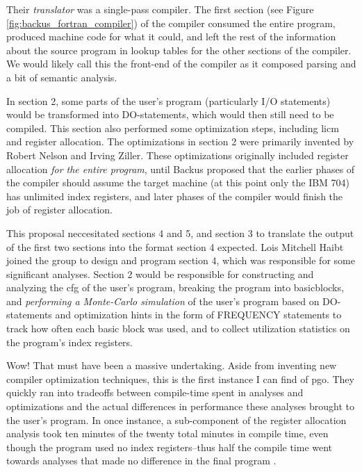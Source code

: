 Their \textit{translator} was a single-pass compiler.
The first section (see Figure \ref{fig:backus_fortran_compiler}) of the compiler
consumed the entire program, produced machine code for what it could,
and left the rest of the information about the source program in lookup tables
for the other sections of the compiler.
We would likely call this the front-end of the compiler as it composed
parsing and a bit of semantic analysis.

In section 2, some parts of the user's program (particularly I/O statements)
would be transformed into DO-statements, which would then still need to be compiled.
This section also performed some optimization steps, including \gls{licm} and
register allocation.
The optimizations in section 2 were primarily invented by Robert Nelson and Irving Ziller.
These optimizations originally included register allocation \textit{for the entire program},
until Backus proposed that the earlier phases of the compiler should assume the
target machine (at this point only the IBM 704) has unlimited index registers,
and later phases of the compiler would finish the job of register allocation.

This proposal neccesitated sections 4 and 5, and section 3 to translate the
output of the first two sections into the format section 4 expected.
Lois Mitchell Haibt joined the group to design and program section 4,
which was responsible for some significant analyses.
Section 2 would be responsible for constructing and analyzing the \gls{cfg}
of the user's program, breaking the program into \gls{basicblock}s,
and \textit{performing a Monte-Carlo simulation} of the user's program
based on DO-statements and optimization hints in the form of FREQUENCY statements
to track how often each basic block was used, and to collect utilization
statistics on the program's index registers.

Wow! That must have been a massive undertaking.
Aside from inventing new compiler optimization techniques, this is the first
instance I can find of \gls{pgo}.
They quickly ran into tradeoffs between compile-time spent in analyses and optimizations
and the actual differences in performance these analyses brought to the user's
program.
In once instance, a sub-component of the register allocation analysis took ten minutes
of the twenty total minutes in compile time,
even though the program used no index registers--thus half the compile time
went towards analyses that made no difference in the final program
\cite{backus_heising_fortran_1964}.

